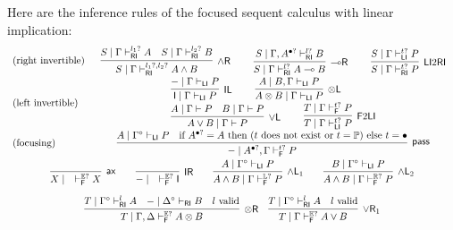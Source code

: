 \documentclass[submission,copyright,creativecommons]{eptcs}
\theoremstyle{definition}
\newcommand{\tl}{\otimes \mathsf{L}}
\newcommand{\tr}{\otimes \mathsf{R}}
\newcommand{\lright}{{\multimap}\mathsf{R}}
\newcommand{\pass}{\mathsf{pass}}
\newcommand{\unitl}{\mathsf{IL}}
\newcommand{\unitr}{\mathsf{IR}}
\newcommand{\andlone}{\land \mathsf{L}_{1}}
\newcommand{\andltwo}{\land \mathsf{L}_{2}}
\newcommand{\andr}{\land \mathsf{R}}
\newcommand{\orl}{\lor \mathsf{L}}
\newcommand{\orrone}{\lor \mathsf{R}_{1}}
\newcommand{\ax}{\mathsf{ax}}
\newcommand{\ot}{\otimes}
\newcommand{\lolli}{\multimap}
\newcommand{\I}{\mathsf{I}}
\newcommand{\RI}{\mathsf{RI}}
\newcommand{\LI}{\mathsf{LI}}
\newcommand{\F}{\mathsf{F}}
\newcommand{\tP}{\mathbb{P}}
\newcommand{\tL}{\mathbb{L}}
\newcommand{\tR}{\mathbb{R}}
\newcommand{\tE}{\mathbb{E}}
\newcommand{\proofbox}[1]{\begin{tabular}{l} #1 \end{tabular}}
\begin{document}
Here are the inference rules of the focused sequent calculus with linear implication:
\begin{equation*}\label{eq:focus:impl}
  \begin{array}{lc}
    \text{(right invertible)} & %
    \proofbox{
      \infer[\andr]{S \mid \Gamma \vdash^{l_1?, l_2?}_{\RI} A \land B}{
        S \mid \Gamma \vdash^{l_1?}_{\RI} A
        &
        S \mid \Gamma \vdash^{l_2?}_{\RI} B
      }
    \qquad
    \infer[\lright]{S \mid \Gamma \vdash^{l?}_{\RI} A \lolli B}{S \mid \Gamma , A^{\bullet ?} \vdash^{l?}_{\RI} B}
    \qquad
    \infer[\LI 2 \RI]{S \mid \Gamma \vdash^{t?}_{\RI} P}{S \mid \Gamma \vdash^{t?}_{\LI} P}
    }
    \\[10pt]
    \text{(left invertible)} & %
    \proofbox{
      \infer[\unitl]{\I \mid \Gamma \vdash_{\LI} P}{{-} \mid \Gamma \vdash_{\LI} P}
    \qquad
    \infer[\tl]{A \ot B \mid \Gamma \vdash_{\LI} P}{A \mid B , \Gamma \vdash_{\LI} P}
    \\
    \infer[\orl]{A \lor B \mid \Gamma \vdash P}{
      A \mid \Gamma \vdash P
      &
      B \mid \Gamma \vdash P
    }
    \qquad
    \infer[\F 2 \LI]{T \mid \Gamma \vdash^{t?}_{\LI} P}{T \mid \Gamma \vdash^{t?}_{\F} P}
    }
    \\[10pt]
    \text{(focusing)} &    %
    \proofbox{
    \infer[\pass]{{-} \mid A^{\bullet ?} , \Gamma \vdash^{t?}_{\F} P }{
        A \mid \Gamma^{\circ} \vdash_{\LI} P
        &
        \text{if } A^{\bullet?} = A \text{ then } (t \text{ does not exist or } t = \tP) \text{ else } t = \bullet
    }
    }
    \\[10pt]
    \multicolumn{2}{c}{
    \infer[\ax]{X \mid \quad \vdash^{\tE?}_{\F} X}{}
    \qquad
    \infer[\unitr]{{-} \mid \quad \vdash^{\tE?}_{\F} \I}{}
    \qquad
    \infer[\andlone]{A \land B \mid \Gamma \vdash^{\tL?}_{\F} P}{A \mid \Gamma^{\circ} \vdash_{\LI} P}
    \qquad
    \infer[\andltwo]{A \land B \mid \Gamma \vdash^{\tR?}_{\F} P}{B \mid \Gamma^{\circ} \vdash_{\LI} P}
    }
    \\[10pt]
    \multicolumn{2}{c}{
    \infer[\tr]{T \mid \Gamma , \Delta \vdash^{\tE?}_{\F} A \ot B}{
      T \mid \Gamma^{\circ} \vdash^{l}_{\RI} A
      &
      {-} \mid \Delta^{\circ} \vdash_{\RI} B
      &
      l \ \text{valid}
    }
    \quad
    \infer[\orrone]{T \mid \Gamma \vdash^{\tE?}_{\F} A \lor B}{
      T \mid \Gamma^{\circ} \vdash^{l}_{\RI} A
      &
      l \ \text{valid}
}}
\end{array}
\end{equation*}
\end{document}
